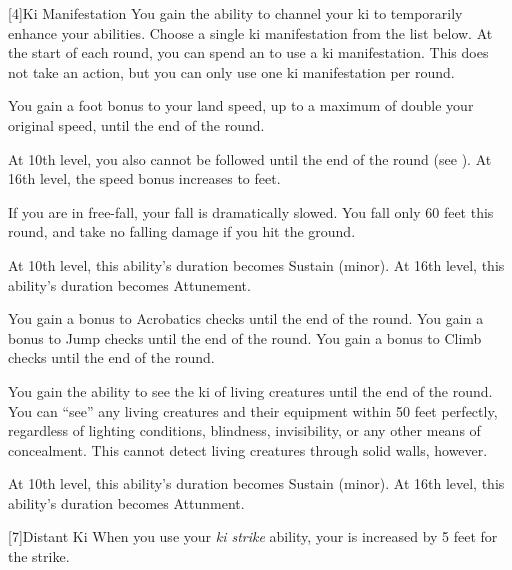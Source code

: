         [4]{Ki Manifestation}
        You gain the ability to channel your ki to temporarily enhance your abilities.
        Choose a single ki manifestation from the list below.
        At the start of each round, you can spend an  to use a ki manifestation.
        This does not take an action, but you can only use one ki manifestation per round.
        {
            You gain a  foot bonus to your land speed, up to a maximum of double your original speed, until the end of the round.

            At 10th level, you also cannot be followed until the end of the round (see ).
            At 16th level, the speed bonus increases to  feet.

            If you are in free-fall, your fall is dramatically slowed.
            You fall only 60 feet this round, and take no falling damage if you hit the ground.

            At 10th level, this ability's duration becomes Sustain (minor).
            At 16th level, this ability's duration becomes Attunement.

            You gain a  bonus to Acrobatics checks until the end of the round.
            You gain a  bonus to Jump checks until the end of the round.
            You gain a  bonus to Climb checks until the end of the round.

            You gain the ability to see the ki of living creatures until the end of the round.
            You can ``see'' any living creatures and their equipment within 50 feet perfectly, regardless of lighting conditions, blindness, invisibility, or any other means of concealment.
            This cannot detect living creatures through solid walls, however.

            At 10th level, this ability's duration becomes Sustain (minor).
            At 16th level, this ability's duration becomes Attunment.
        }

        [7]{Distant Ki} When you use your \textit{ki strike} ability, your  is increased by 5 feet for the strike.

